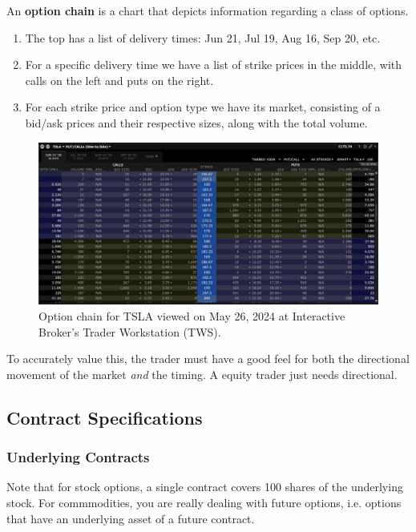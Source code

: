 \documentclass{article}
\begin{document}
    \begin{example}
      An \textbf{option chain} is a chart that depicts information regarding a class of options. 
      \begin{enumerate}
        \item The top has a list of delivery times: Jun 21, Jul 19, Aug 16, Sep 20, etc. 
        \item For a specific delivery time we have a list of strike prices in the middle, with calls on the left and puts on the right. 
        \item For each strike price and option type we have its market, consisting of a bid/ask prices and their respective sizes, along with the total volume. 
      \end{enumerate}
      \begin{figure}[H]
        \centering 
        \includegraphics[scale=0.28]{img/option_chain.png}
        \caption{Option chain for TSLA viewed on May 26, 2024 at Interactive Broker's Trader Workstation (TWS). } 
        \label{fig:option_chain}
      \end{figure}
    \end{example}

    To accurately value this, the trader must have a good feel for both the directional movement of the market \textit{and} the timing. A equity trader just needs directional. 

  \subsection{Contract Specifications}

    \subsubsection{Underlying Contracts}

      \begin{example}[Underlying]
        Note that for stock options, a single contract covers 100 shares of the underlying stock. For commmodities, you are really dealing with future options, i.e. options that have an underlying asset of a future contract. 
      \end{example}
\end{document}
